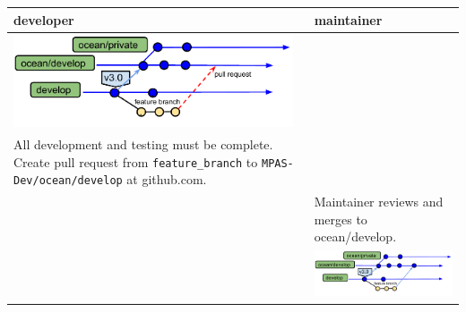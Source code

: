 \documentclass[11pt]{article}
\begin{document}
\begin{enumerate}
\begin{centering}
\end{centering}
 \begin{tabular}[c]{L{3.3in}|L{3.3in}}
developer & maintainer \\
\hline
\includegraphics[width=3.25in]{f/MPASworkflow_ext3.pdf} \\
All development and testing must be complete.
Create pull request from \verb|feature_branch| to \verb|MPAS-Dev/ocean/develop| at github.com. \\
& Maintainer reviews and merges to ocean/develop.\\
& \includegraphics[width=3.25in]{f/MPASworkflow_ext4.pdf} \\
 \end{tabular}


\end{enumerate}



\end{document}
